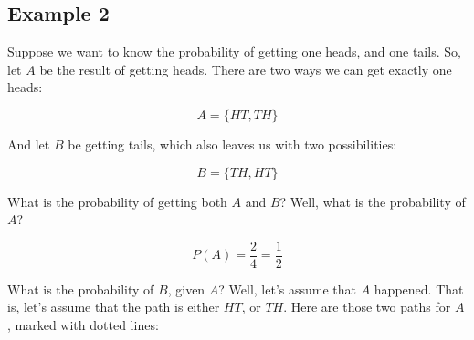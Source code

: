 \documentclass[../../../main.tex]{subfiles}
\begin{document}
\subsection{Example 2}

Suppose we want to know the probability of getting one heads, and one tails. So, let $A$ be the result of getting heads. There are two ways we can get exactly one heads:

\begin{equation*}
  A = \{ HT, TH \}
\end{equation*}

\noindent
And let $B$ be getting tails, which also leaves us with two possibilities:

\begin{equation*}
  B = \{ TH, HT \}
\end{equation*}

\noindent
What is the probability of getting both $A$ and $B$? Well, what is the probability of $A$?

\begin{equation*}
  P(A) = \frac{2}{4} = \frac{1}{2}
\end{equation*}

\noindent
What is the probability of $B$, given $A$? Well, let's assume that $A$ happened. That is, let's assume that the path is either $HT$, or $TH$. Here are those two paths for $A$, marked with dotted lines:

\begin{center}
\end{center}
\end{document}
